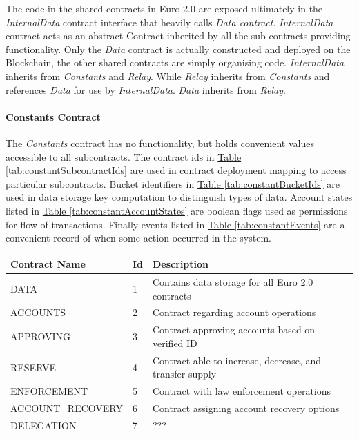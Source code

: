 \documentclass[12pt]{article} %
\newcommand{\hypertableref}[1]{\hyperref[#1]{Table \ref{#1}}}
\begin{document}
{{The code in the shared contracts in Euro 2.0 are exposed ultimately in the \textit{InternalData} contract interface that heavily calls \textit{Data contract}. \textit{InternalData} contract acts as an abstract Contract inherited by all the sub contracts providing functionality. Only the \textit{Data} contract is actually constructed and deployed on the Blockchain, the other shared contracts are simply organising code. \textit{InternalData} inherits from \textit{Constants} and \textit{Relay}. While \textit{Relay} inherits from \textit{Constants} and references \textit{Data} for use by \textit{InternalData}. \textit{Data} inherits from \textit{Relay}.

\paragraph{Constants Contract}

The \textit{Constants} contract has no functionality, but holds convenient values accessible to all subcontracts. The contract ids in \hypertableref{tab:constantSubcontractIds} are used in contract deployment mapping to access particular subcontracts. Bucket identifiers in \hypertableref{tab:constantBucketIds} are used in data storage key computation to distinguish types of data. Account states listed in \hypertableref{tab:constantAccountStates} are boolean flags used as permissions for flow of transactions. Finally events listed in \hypertableref{tab:constantEvents} are a convenient record of when some action occurred in the system.

\begin{center}
\begin{tabular}{ | l | l | p{10cm} | }
 \hline
 Contract Name & Id & Description
 \\ \hline\hline
 DATA & 1 & Contains data storage for all Euro 2.0 contracts
 \\ \hline
 ACCOUNTS & 2 & Contract regarding account operations
 \\ \hline
 APPROVING & 3 & Contract approving accounts based on verified ID
 \\ \hline
 RESERVE & 4 & Contract able to increase, decrease, and transfer supply
 \\ \hline
 ENFORCEMENT & 5 & Contract with law enforcement operations
 \\ \hline
 ACCOUNT\_RECOVERY & 6 & Contract assigning account recovery options
 \\ \hline
 DELEGATION & 7 & ???
 \\ \hline
\end{tabular}
\end{center}
\label{tab:constantSubcontractIds}

}}
\end{document}
